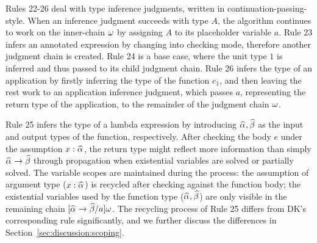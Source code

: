 \begin{comment}
Old text:
The design of our judgment chain is closely related to the shape of
the judgments
\jimmy{requires further clarification}
\bruno{What property? Not very clear}.
Subtyping and checking do not return anything, so variables cannot
leak anyway, as applied to Rules 8 and 9.
\bruno{Is the discussion that follows in the right place? We just jump
  to
  rule 26. Perhaps we can wait until we talk about inference to
  discuss those issues?}
However, inference and application inference may return a type that contains new variables.
Take Rule 26 as an example, if it simply returns $\al \to \bt$,
passes that to the next judgment and continues the type-checking process,
variables $\al$ and $\bt$ in the next judgment are out of scope
and will break the well-formedness of the worklist.
\end{comment}

Rules 22-26 deal with type inference judgments, written in continuation-passing-style.
When an inference judgment succeeds with type $A$,
the algorithm continues to work on the inner-chain $\omega$ by
assigning $A$ to its placeholder variable $a$.
Rule 23 infers an annotated expression by changing into checking mode,
therefore another judgment chain is created.
Rule 24 is a base case,
where the unit type $1$ is inferred and thus passed to its child judgment chain.
Rule 26 infers the type of an application by
firstly inferring the type of the function $e_1$,
and then leaving the rest work to an application inference judgment,
which passes $a$, representing the return type of the application,
to the remainder of the judgment chain $\omega$.

Rule 25 infers the type of a lambda expression by introducing $\al, \bt$
as the input and output types of the function, respectively.
After checking the body $e$ under the assumption $x:\al$,
the return type might reflect more information than simply $\al \to \bt$
through propagation when existential variables are solved or partially solved.
The variable scopes are maintained during the process:
the assumption of argument type ($x:\al$) is recycled after checking against the function body;
the existential variables used by the function type ($\al,\bt$) are only visible in the remaining chain $[\al\to\bt/a]\jg$.
The recycling process of Rule 25 differs from DK's corresponding rule significantly,
and we further discuss the differences in Section~\ref{sec:discussion:scoping}.


